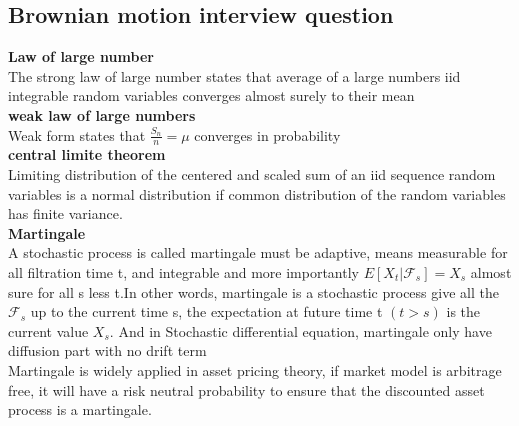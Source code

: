 \documentclass[a4paper,11pt]{article}
\begin{document}
\subsection{Brownian motion interview question}
{\bf Law of large number}\\
The strong law of large number states that average of a large numbers iid integrable random variables converges almost surely to their mean\\
{\bf weak law of large numbers}\\
Weak form states that $\frac{S_n}{n} =\mu$ converges in probability\\
{\bf central limite theorem}\\
Limiting distribution of the centered and scaled sum of an iid sequence random variables is a normal distribution if common distribution of the random variables has finite variance.\\
{\bf Martingale}\\
A stochastic process is called martingale must be adaptive, means measurable for all filtration time t, and integrable and more importantly $E[X_t|\mathcal{F}_s]=X_s$ almost sure for all s less t.In other words, martingale is a stochastic process give all the  $\mathcal{F}_s$ up to the current time s, the expectation at future time t $(t>s)$ is the current value $X_s$. And in Stochastic differential equation, martingale only have diffusion part with no drift term\\
Martingale is widely applied in asset pricing theory, if market model is arbitrage free, it will have a risk neutral probability to ensure that the discounted asset process is a martingale.\\
\end{document}
